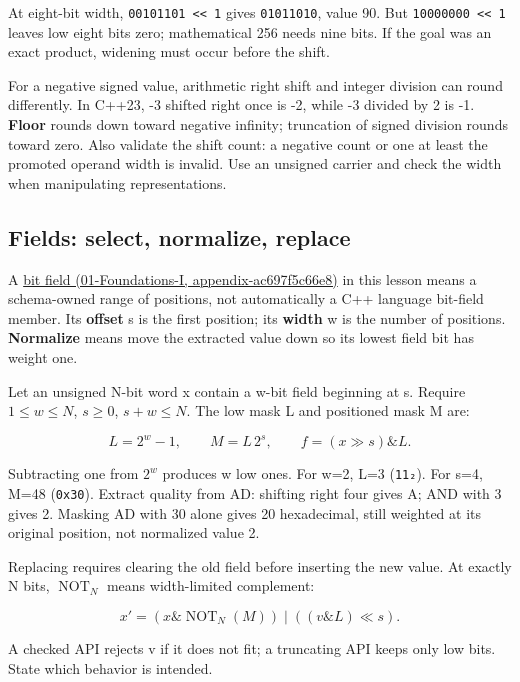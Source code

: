 At eight-bit width, \texttt{00101101\ \textless{}\textless{}\ 1} gives \texttt{01011010}, value 90. But \texttt{10000000\ \textless{}\textless{}\ 1} leaves low eight bits zero; mathematical 256 needs nine bits. If the goal was an exact product, widening must occur before the shift.

For a negative signed value, arithmetic right shift and integer division can round differently. In C++23, -3 shifted right once is -2, while -3 divided by 2 is -1. \textbf{Floor} rounds down toward negative infinity; truncation of signed division rounds toward zero. Also validate the shift count: a negative count or one at least the promoted operand width is invalid. Use an unsigned carrier and check the width when manipulating representations.

\subsection{Fields: select, normalize, replace}\label{05-engine-i-ch001-fields-select-normalize-replace}

A \href{../01-Foundations-I/main.pdf\#nameddest=appendix-ac697f5c66e8}{bit field (01-Foundations-I, appendix-ac697f5c66e8)} in this lesson means a schema-owned range of positions, not automatically a C++ language bit-field member. Its \textbf{offset} s is the first position; its \textbf{width} w is the number of positions. \textbf{Normalize} means move the extracted value down so its lowest field bit has weight one.

Let an unsigned N-bit word x contain a w-bit field beginning at s. Require \(1\le w\le N\), \(s\ge0\), \(s+w\le N\). The low mask L and positioned mask M are:

\[
L=2^w-1,\qquad M=L\,2^s,\qquad f=(x\gg s)\mathbin{\&}L.
\]

Subtracting one from \(2^w\) produces w low ones. For w=2, L=3 (\texttt{11₂}). For s=4, M=48 (\texttt{0x30}). Extract quality from AD: shifting right four gives A; AND with 3 gives 2. Masking AD with 30 alone gives 20 hexadecimal, still weighted at its original position, not normalized value 2.

Replacing requires clearing the old field before inserting the new value. At exactly N bits, \(\operatorname{NOT}_N\) means width-limited complement:

\[
x'=(x\mathbin{\&}\operatorname{NOT}_N(M))
\mathbin{|}((v\mathbin{\&}L)\ll s).
\]

A checked API rejects v if it does not fit; a truncating API keeps only low bits. State which behavior is intended.


